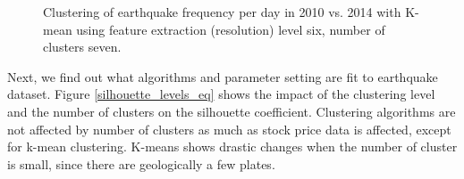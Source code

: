 \documentclass{article}
\begin{document}
\begin{figure}
\begin{center}
\caption{Clustering of earthquake frequency per day in 2010 vs. 2014 with K-mean
using feature extraction (resolution) level six, number of clusters seven.}
\label{Cluster2010vs.2013}
\end{center}
\end{figure}

Next, we find out what algorithms and parameter setting are fit to earthquake dataset. Figure \ref{silhouette_levels_eq} shows the impact of the clustering level and the number of clusters on the silhouette coefficient. Clustering algorithms are not affected by number of clusters as much as stock price data is affected, except for k-mean clustering. K-means shows drastic changes when the number of cluster is small, since there are geologically a few plates.
\end{document}
